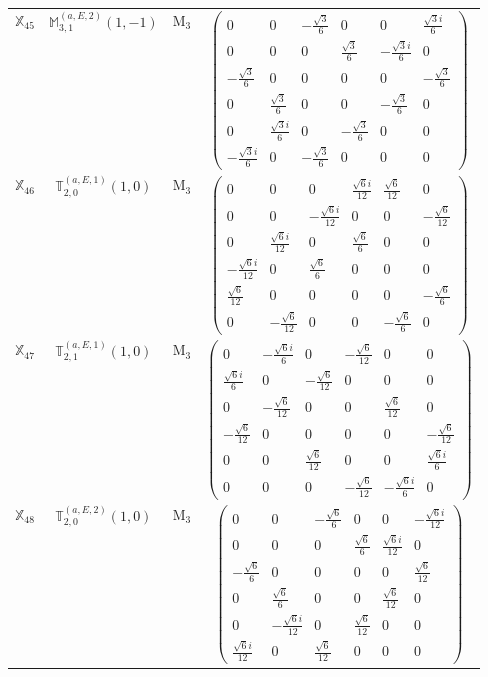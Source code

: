 \documentclass[fleqn,10pt,landscape]{article}
\begin{document}
\begin{itemize}
\begin{center}
\begin{longtable}{c|c|c|c}
$ \mathbb{X}_{45} $ & $\mathbb{M}_{3,1}^{(a,E,2)}(1,-1)$ & M$_{3}$ & $\begin{pmatrix} 0 & 0 & - \frac{\sqrt{3}}{6} & 0 & 0 & \frac{\sqrt{3} i}{6} \\ 0 & 0 & 0 & \frac{\sqrt{3}}{6} & - \frac{\sqrt{3} i}{6} & 0 \\ - \frac{\sqrt{3}}{6} & 0 & 0 & 0 & 0 & - \frac{\sqrt{3}}{6} \\ 0 & \frac{\sqrt{3}}{6} & 0 & 0 & - \frac{\sqrt{3}}{6} & 0 \\ 0 & \frac{\sqrt{3} i}{6} & 0 & - \frac{\sqrt{3}}{6} & 0 & 0 \\ - \frac{\sqrt{3} i}{6} & 0 & - \frac{\sqrt{3}}{6} & 0 & 0 & 0 \end{pmatrix}$ \\
$ \mathbb{X}_{46} $ & $\mathbb{T}_{2,0}^{(a,E,1)}(1,0)$ & M$_{3}$ & $\begin{pmatrix} 0 & 0 & 0 & \frac{\sqrt{6} i}{12} & \frac{\sqrt{6}}{12} & 0 \\ 0 & 0 & - \frac{\sqrt{6} i}{12} & 0 & 0 & - \frac{\sqrt{6}}{12} \\ 0 & \frac{\sqrt{6} i}{12} & 0 & \frac{\sqrt{6}}{6} & 0 & 0 \\ - \frac{\sqrt{6} i}{12} & 0 & \frac{\sqrt{6}}{6} & 0 & 0 & 0 \\ \frac{\sqrt{6}}{12} & 0 & 0 & 0 & 0 & - \frac{\sqrt{6}}{6} \\ 0 & - \frac{\sqrt{6}}{12} & 0 & 0 & - \frac{\sqrt{6}}{6} & 0 \end{pmatrix}$ \\
$ \mathbb{X}_{47} $ & $\mathbb{T}_{2,1}^{(a,E,1)}(1,0)$ & M$_{3}$ & $\begin{pmatrix} 0 & - \frac{\sqrt{6} i}{6} & 0 & - \frac{\sqrt{6}}{12} & 0 & 0 \\ \frac{\sqrt{6} i}{6} & 0 & - \frac{\sqrt{6}}{12} & 0 & 0 & 0 \\ 0 & - \frac{\sqrt{6}}{12} & 0 & 0 & \frac{\sqrt{6}}{12} & 0 \\ - \frac{\sqrt{6}}{12} & 0 & 0 & 0 & 0 & - \frac{\sqrt{6}}{12} \\ 0 & 0 & \frac{\sqrt{6}}{12} & 0 & 0 & \frac{\sqrt{6} i}{6} \\ 0 & 0 & 0 & - \frac{\sqrt{6}}{12} & - \frac{\sqrt{6} i}{6} & 0 \end{pmatrix}$ \\
$ \mathbb{X}_{48} $ & $\mathbb{T}_{2,0}^{(a,E,2)}(1,0)$ & M$_{3}$ & $\begin{pmatrix} 0 & 0 & - \frac{\sqrt{6}}{6} & 0 & 0 & - \frac{\sqrt{6} i}{12} \\ 0 & 0 & 0 & \frac{\sqrt{6}}{6} & \frac{\sqrt{6} i}{12} & 0 \\ - \frac{\sqrt{6}}{6} & 0 & 0 & 0 & 0 & \frac{\sqrt{6}}{12} \\ 0 & \frac{\sqrt{6}}{6} & 0 & 0 & \frac{\sqrt{6}}{12} & 0 \\ 0 & - \frac{\sqrt{6} i}{12} & 0 & \frac{\sqrt{6}}{12} & 0 & 0 \\ \frac{\sqrt{6} i}{12} & 0 & \frac{\sqrt{6}}{12} & 0 & 0 & 0 \end{pmatrix}$ \\

\end{longtable}
\end{center}
\end{itemize}
\end{document}
